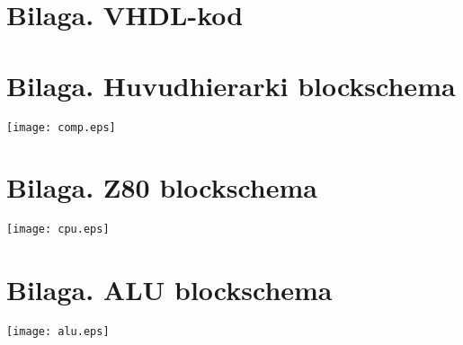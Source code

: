 \documentclass[main.tex]{subfiles}
\begin{document}
\appendix
\section{Bilaga. VHDL-kod}


\newpage
\recalctypearea
\vspace*{-10mm}
\section{Bilaga. Huvudhierarki blockschema}
\begin{minipage}{\textwidth}
    \texttt{[image: comp.eps]}
\end{minipage}
\vspace*{-10mm}
\section{Bilaga. Z80 blockschema}
\begin{minipage}{\textwidth}
    \vspace{-2mm}
    \hspace{-15mm}
    \texttt{[image: cpu.eps]}
\end{minipage}
\vspace*{-10mm}
\section{Bilaga. ALU blockschema}
\begin{minipage}{\textwidth}
    \texttt{[image: alu.eps]}
\end{minipage}
\newpage
\recalctypearea
\end{document}
